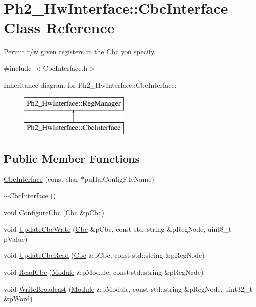 \hypertarget{class_ph2___hw_interface_1_1_cbc_interface}{\section{Ph2\-\_\-\-Hw\-Interface\-:\-:Cbc\-Interface Class Reference}
\label{class_ph2___hw_interface_1_1_cbc_interface}
}


Permit r/w given registers in the Cbc you specify.  




{\ttfamily \#include $<$Cbc\-Interface.\-h$>$}

Inheritance diagram for Ph2\-\_\-\-Hw\-Interface\-:\-:Cbc\-Interface\-:\begin{figure}[H]
\begin{center}
\leavevmode
\includegraphics[height=2.000000cm]{class_ph2___hw_interface_1_1_cbc_interface}
\end{center}
\end{figure}
\subsection*{Public Member Functions}
\begin{DoxyCompactItemize}
\item 
\hyperlink{class_ph2___hw_interface_1_1_cbc_interface_a3ddefe5549da06a7d26fee1502a792b4}{Cbc\-Interface} (const char $\ast$pu\-Hal\-Config\-File\-Name)
\item 
\hyperlink{class_ph2___hw_interface_1_1_cbc_interface_a1f0ab7d7cf7783a0fe275e8e1d7e5a49}{$\sim$\-Cbc\-Interface} ()
\item 
void \hyperlink{class_ph2___hw_interface_1_1_cbc_interface_af5cf4eb5b7134835f00349cb19f35c56}{Configure\-Cbc} (\hyperlink{class_ph2___hw_description_1_1_cbc}{Cbc} \&p\-Cbc)
\item 
void \hyperlink{class_ph2___hw_interface_1_1_cbc_interface_ae046d10fdb494b5c8bcb831016c02738}{Update\-Cbc\-Write} (\hyperlink{class_ph2___hw_description_1_1_cbc}{Cbc} \&p\-Cbc, const std\-::string \&p\-Reg\-Node, uint8\-\_\-t p\-Value)
\item 
void \hyperlink{class_ph2___hw_interface_1_1_cbc_interface_ab08ea1de98fe120098a4f5c52e017393}{Update\-Cbc\-Read} (\hyperlink{class_ph2___hw_description_1_1_cbc}{Cbc} \&p\-Cbc, const std\-::string \&p\-Reg\-Node)
\item 
void \hyperlink{class_ph2___hw_interface_1_1_cbc_interface_a46314c37156baa31c484c1141218bb49}{Read\-Cbc} (\hyperlink{class_ph2___hw_description_1_1_module}{Module} \&p\-Module, const std\-::string \&p\-Reg\-Node)
\item 
void \hyperlink{class_ph2___hw_interface_1_1_cbc_interface_a2aa83fb17f550cd65d32a07960a158ab}{Write\-Broadcast} (\hyperlink{class_ph2___hw_description_1_1_module}{Module} \&p\-Module, const std\-::string \&p\-Reg\-Node, uint32\-\_\-t \&p\-Word)
\end{DoxyCompactItemize}

